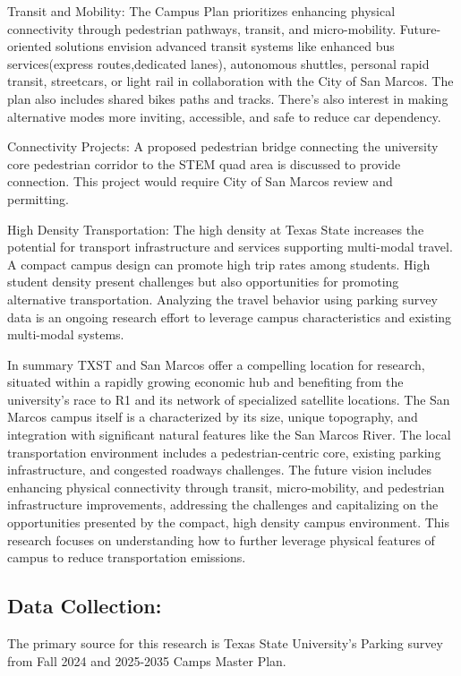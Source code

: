 \documentclass[
  letterpaper,
  DIV=11,
  numbers=noendperiod]{scrartcl}
\begin{document}
Transit and Mobility: The Campus Plan prioritizes enhancing physical
connectivity through pedestrian pathways, transit, and micro-mobility.
Future-oriented solutions envision advanced transit systems like
enhanced bus services(express routes,dedicated lanes), autonomous
shuttles, personal rapid transit, streetcars, or light rail in
collaboration with the City of San Marcos. The plan also includes shared
bikes paths and tracks. There's also interest in making alternative
modes more inviting, accessible, and safe to reduce car dependency.

Connectivity Projects: A proposed pedestrian bridge connecting the
university core pedestrian corridor to the STEM quad area is discussed
to provide connection. This project would require City of San Marcos
review and permitting.

High Density Transportation: The high density at Texas State increases
the potential for transport infrastructure and services supporting
multi-modal travel. A compact campus design can promote high trip rates
among students. High student density present challenges but also
opportunities for promoting alternative transportation. Analyzing the
travel behavior using parking survey data is an ongoing research effort
to leverage campus characteristics and existing multi-modal systems.

In summary TXST and San Marcos offer a compelling location for research,
situated within a rapidly growing economic hub and benefiting from the
university's race to R1 and its network of specialized satellite
locations. The San Marcos campus itself is a characterized by its size,
unique topography, and integration with significant natural features
like the San Marcos River. The local transportation environment includes
a pedestrian-centric core, existing parking infrastructure, and
congested roadways challenges. The future vision includes enhancing
physical connectivity through transit, micro-mobility, and pedestrian
infrastructure improvements, addressing the challenges and capitalizing
on the opportunities presented by the compact, high density campus
environment. This research focuses on understanding how to further
leverage physical features of campus to reduce transportation emissions.

\subsection{Data Collection:}\label{data-collection}

The primary source for this research is Texas State University's Parking
survey from Fall 2024 and 2025-2035 Camps Master Plan.
\end{document}
